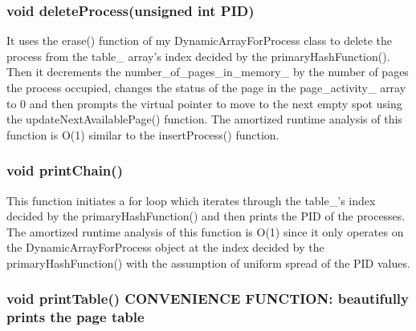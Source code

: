     \subsubsection{{\color{orange}void} {\color{draculapurple}deleteProcess}({\color{orange}unsigned int} PID)}
        It uses the {\color{draculapurple}erase()} function of my {\color{draculapurple}DynamicArrayForProcess} class to delete the process from the {\color{Turquoise}table\_} array's index decided by the {\color{draculapurple}primaryHashFunction()}.
        Then it decrements the {\color{Turquoise}number\_of\_pages\_in\_memory\_} by the number of pages the process 
        occupied, changes the status of the page in the {\color{Turquoise}page\_activity\_} array to {\color{LightPink}0} and 
        then prompts the virtual pointer to move to the next empty spot using the {\color{draculapurple}updateNextAvailablePage()} function.
        The amortized runtime analysis of this function is {\color{lightblue}O(1)} similar to the {\color{draculapurple}insertProcess()} function.

    \subsubsection{{\color{orange}void} {\color{draculapurple}printChain}()}
        This function initiates a for loop which iterates through the {\color{Turquoise}table\_}'s index 
        decided by the {\color{draculapurple}primaryHashFunction()} and then prints the {\color{draculapurple}PID} of the processes.
        The amortized runtime analysis of this function is {\color{lightblue}O(1)} since it only operates on the 
        {\color{Turquoise}DynamicArrayForProcess} object at the index decided by the {\color{draculapurple}primaryHashFunction()} 
        with the assumption of uniform spread of the {\color{draculapurple}PID} values.
        \subsubsection{{\color{orange}void} {\color{draculapurple}printTable}() {\color{Awesome}CONVENIENCE FUNCTION:} {\color{yellow}beautifully prints the page table}} 
        
